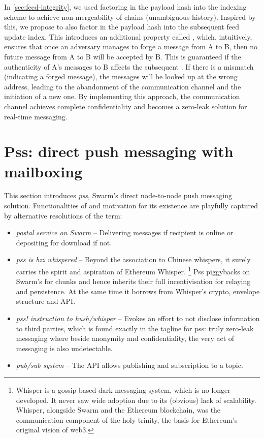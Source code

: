 In \ref{sec:feed-integrity}, we used factoring in the payload hash into the indexing scheme to achieve non-mergeability of chains (unambiguous history). Inspired by this, we propose to also factor in the payload hash into the subsequent feed update index. This introduces an additional property called ,  which, intuitively, ensures that once an adversary manages to forge a message from A to B, then no future message from A to B will be accepted by B.
This is guaranteed if the authenticity of A's  messages to B affects the subsequent . If there is a mismatch (indicating a forged message), the messages will be looked up at the wrong address, leading to the abandonment of the communication channel and the initiation of a new one. By implementing this approach, the communication channel achieves complete confidentiality and becomes a zero-leak solution for real-time messaging.




\section{Pss: direct push messaging with mailboxing \statusgreen}\label{sec:pss}

\green{}

This section introduces \emph{pss}, Swarm's direct node-to-node push messaging solution. 
Functionalities of and motivation for its existence are playfully captured by alternative resolutions of the term:

\begin{itemize}[noitemsep]
\item \emph{postal service on Swarm} -- Delivering messages if recipient is online or depositing for download if not.
\item \emph{pss is bzz whispered} -- Beyond the association to Chinese whispers, it surely carries the spirit and aspiration of Ethereum Whisper.%
%
\footnote{Whisper is a gossip-based dark messaging system, which is no longer developed. It never saw wide adoption due to its (obvious) lack of scalability. Whisper, alongside Swarm and the Ethereum blockchain, was the communication component of the holy trinity, the basis for Ethereum's original vision of web3.}
%
Pss piggybacks on Swarm's  for chunks and hence inherits their full incentivisation for relaying and persistence. At the same time it borrows from Whisper's crypto, envelope structure and API.
\item \emph{pss! instruction to hush/whisper} -- Evokes an effort to not disclose information to third parties, which is found exactly in the tagline for pss: truly zero-leak messaging where beside anonymity and confidentiality, the very act of messaging is also undetectable.
\item  \emph{pub/sub system} -- The API allows publishing and subscription to a topic.
\end{itemize}

